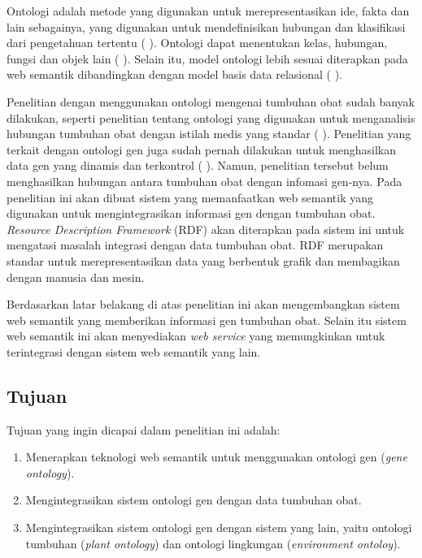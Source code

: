 Ontologi adalah metode yang digunakan untuk merepresentasikan ide, fakta dan lain sebagainya, yang digunakan untuk mendefinisikan hubungan dan klasifikasi dari pengetahuan tertentu (\citeauthor{JEPSEN2010} \cite*{JEPSEN2010}). Ontologi dapat menentukan kelas, hubungan, fungsi dan objek lain (\citeauthor{DILECCE2008} \cite*{DILECCE2008}). Selain itu, model ontologi lebih sesuai diterapkan pada web semantik dibandingkan dengan model basis data relasional (\citeauthor{LAALLAM2013} \cite*{LAALLAM2013}).

Penelitian dengan menggunakan ontologi mengenai tumbuhan obat sudah banyak dilakukan, seperti penelitian tentang ontologi yang digunakan untuk menganalisis hubungan tumbuhan obat dengan istilah medis yang standar (\citeauthor{VADIVU2012} \cite*{VADIVU2012}). Penelitian yang terkait dengan ontologi gen juga sudah pernah dilakukan untuk menghasilkan data gen yang dinamis dan terkontrol (\citeauthor{ASHBURNERM2000} \cite*{ASHBURNERM2000}). Namun, penelitian tersebut belum menghasilkan hubungan antara tumbuhan obat dengan infomasi gen-nya. Pada penelitian ini akan dibuat sistem yang memanfaatkan web semantik yang digunakan untuk mengintegrasikan informasi gen dengan tumbuhan obat. \textit{Resource Description Framework} (RDF) akan diterapkan pada sistem ini untuk mengatasi masalah integrasi dengan data tumbuhan obat. RDF merupakan standar untuk merepresentasikan data yang berbentuk grafik dan membagikan dengan manusia dan mesin. 

Berdasarkan latar belakang di atas penelitian ini akan mengembangkan sistem web semantik yang memberikan informasi gen tumbuhan obat. Selain itu sistem web semantik ini akan menyediakan \textit{web service} yang memungkinkan untuk terintegrasi dengan sistem web semantik yang lain.

\subsection*{Tujuan}
Tujuan yang ingin dicapai dalam penelitian ini adalah:
\begin{enumerate}[noitemsep] 
\item Menerapkan teknologi web semantik untuk menggunakan ontologi gen (\textit{gene ontology}).
\item Mengintegrasikan sistem ontologi gen dengan data tumbuhan obat.
\item Mengintegrasikan sistem ontologi gen dengan sistem yang lain, yaitu ontologi tumbuhan (\textit{plant ontology}) dan ontologi lingkungan (\textit{environment ontoloy}).
\end{enumerate}

